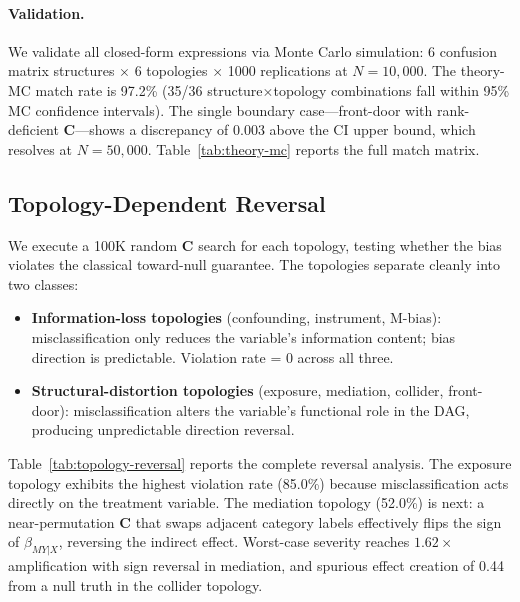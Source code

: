 \documentclass[11pt]{article}
\newcommand{\bC}{\mathbf{C}}
\begin{document}
\paragraph{Validation.}
We validate all closed-form expressions via Monte Carlo simulation: 6 confusion matrix structures $\times$ 6 topologies $\times$ 1000 replications at $N\!=\!10{,}000$.
The theory-MC match rate is 97.2\% (35/36 structure$\times$topology combinations fall within 95\% MC confidence intervals).
The single boundary case---front-door with rank-deficient $\bC$---shows a discrepancy of 0.003 above the CI upper bound, which resolves at $N\!=\!50{,}000$.
Table~\ref{tab:theory-mc} reports the full match matrix.

\subsection{Topology-Dependent Reversal}
\label{sec:reversal}

We execute a 100K random $\bC$ search for each topology, testing whether the bias violates the classical toward-null guarantee.
The topologies separate cleanly into two classes:

\begin{itemize}
    \item \textbf{Information-loss topologies} (confounding, instrument, M-bias): misclassification only reduces the variable's information content; bias direction is predictable. Violation rate = 0 across all three.
    \item \textbf{Structural-distortion topologies} (exposure, mediation, collider, front-door): misclassification alters the variable's functional role in the DAG, producing unpredictable direction reversal.
\end{itemize}

Table~\ref{tab:topology-reversal} reports the complete reversal analysis.
The exposure topology exhibits the highest violation rate (85.0\%) because misclassification acts directly on the treatment variable.
The mediation topology (52.0\%) is next: a near-permutation $\bC$ that swaps adjacent category labels effectively flips the sign of $\beta_{MY|X}$, reversing the indirect effect.
Worst-case severity reaches $1.62\times$ amplification with sign reversal in mediation, and spurious effect creation of 0.44 from a null truth in the collider topology.
\end{document}
